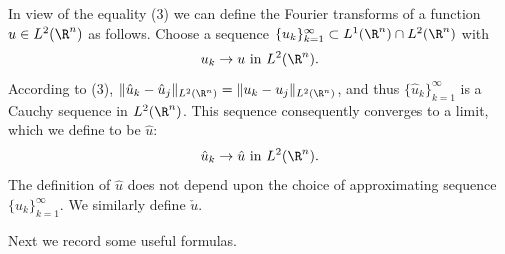 \begin{definition}
\label{def:fourier-transform-l2}
In view of the equality (3) we can define the Fourier transforms of a function $u \in L^2(\R^n)$ as follows. Choose a sequence $\{u_k\}_{k=1}^\infty \subset L^1(\R^n) \cap L^2(\R^n)$ with
$$u_k \to u \text{ in } L^2(\R^n).$$
According to (3), $\|\hat{u}_k - \hat{u}_j\|_{L^2(\R^n)} = \|u_k - u_j\|_{L^2(\R^n)}$, and thus $\{\hat{u}_k\}_{k=1}^\infty$ is a Cauchy sequence in $L^2(\R^n)$. This sequence consequently converges to a limit, which we define to be $\hat{u}$:
$$\hat{u}_k \to \hat{u} \text{ in } L^2(\R^n).$$
The definition of $\hat{u}$ does not depend upon the choice of approximating sequence $\{u_k\}_{k=1}^\infty$. We similarly define $\check u$.
\end{definition}

Next we record some useful formulas.

